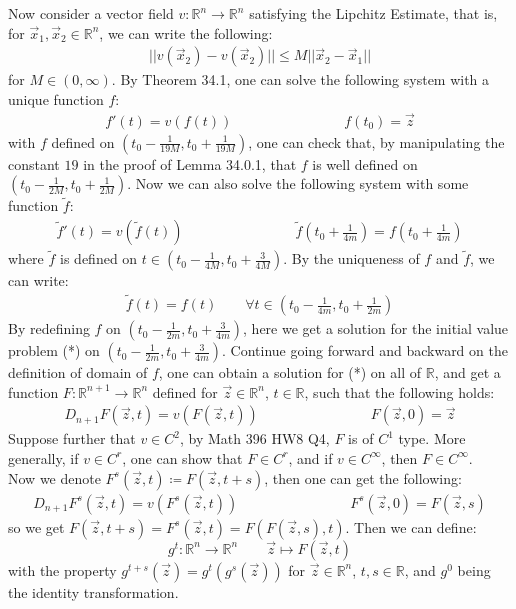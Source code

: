 \documentclass[11pt,oneside]{book}
\theoremstyle{break}
\theoremstyle{break}
\newcommand{\R}{\mathbb{R}}
\newcommand{\that}[1]{\widetilde{#1}}
\begin{document}
Now consider a vector field $v:\R^n \to \R^n$ satisfying the Lipchitz Estimate, that is, for $\vec{x}_1,\vec{x}_2 \in \R^n$, we can write the following:
\begin{align*}
||v(\vec{x}_2) - v(\vec{x}_2)|| \leq M ||\vec{x}_2-\vec{x}_1|| 
\end{align*}
for $M\in (0,\infty)$. By Theorem 34.1, one can solve the following system with a unique function $f$:
\begin{align*}
f'(t) = v(f(t)) \qquad\qquad\qquad\qquad f(t_0) = \vec{z} \tag{*}
\end{align*}  
with $f$ defined on $(t_0 - \frac{1}{19M}, t_0 + \frac{1}{19M})$, one can check that, by manipulating the constant $19$ in the proof of Lemma 34.0.1, that $f$ is well defined on $(t_0 - \frac{1}{2M}, t_0 + \frac{1}{2M})$. Now we can also solve the following system with some function $\that{f}$:
\begin{align*}
\that{f}'(t) = v(\that{f}(t)) \qquad\qquad\qquad\qquad \that{f}\left(t_0 + \frac{1}{4m}\right) = f\left(t_0 + \frac{1}{4m}\right)
\end{align*}
where $\that{f}$ is defined on $t \in (t_0 - \frac{1}{4M}, t_0+\frac{3}{4M})$. By the uniqueness of $f$ and $\that{f}$, we can write:
\begin{align*}
\that{f}(t) = f(t) \qquad \forall t\in\left(t_0 - \frac{1}{4m}, t_0 + \frac{1}{2m}\right)
\end{align*}
By redefining $f$ on $(t_0 - \frac{1}{2m}, t_0+\frac{3}{4m})$, here we get a solution for the initial value problem (*) on $(t_0 - \frac{1}{2m}, t_0+\frac{3}{4m})$. Continue going forward and backward on the definition of domain of $f$, one can obtain a solution for (*) on all of $\R$, and get a function $F:\R^{n+1} \to \R^n$ defined for $\vec{z}\in \R^n$, $t \in \R$, such that the following holds:
\begin{align*}
D_{n+1}F(\vec{z},t) = v(F(\vec{z},t))
\qquad\qquad\qquad\qquad
F(\vec{z},0) = \vec{z}
\end{align*}
Suppose further that $v\in C^2$, by Math 396 HW8 Q4, $F$ is of $C^1$ type. More generally, if $v\in C^{r}$, one can show that $F \in C^{r}$, and if $v \in C^\infty$, then $F \in C^\infty$. \\

Now we denote $F^s(\vec{z},t) \coloneqq F(\vec{z}, t+s)$, then one can get the following:
\begin{align*}
D_{n+1} F^s(\vec{z},t) = v(F^s(\vec{z},t)) \qquad\qquad\qquad\qquad F^s(\vec{z},0) = F(\vec{z},s)
\end{align*}
so we get $F(\vec{z},t+s) = F^s(\vec{z},t) = F(F(\vec{z},s),t)$. Then we can define:
$$g^t:\R^n \to \R^n \qquad \vec{z}\mapsto F(\vec{z},t)$$ 
with the property $g^{t+s}(\vec{z}) = g^t(g^s(\vec{z}))$ for $\vec{z}\in \R^n$, $t,s \in \R$, and $g^0$ being the identity transformation. \\
\end{document}
